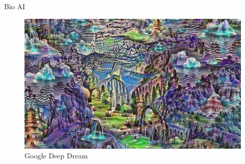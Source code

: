 \begin{frame}{Bio AI}
\begin{figure}
  \includegraphics[width=\textwidth]{img/iterative_places}
\captionsetup{singlelinecheck=off,justification=raggedright}
\caption{Google Deep Dream \cite{Mordvintsev2015Inceptionism:Networks}}
\end{figure}
\end{frame}

